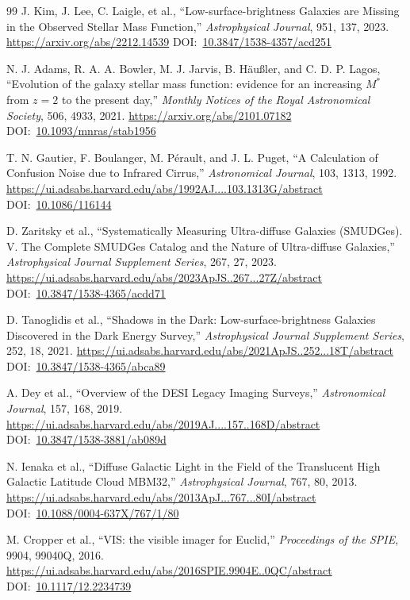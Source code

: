 \documentclass[10pt,onecolumn]{article}
\newcommand{\doi}[1]{DOI:~\href{https://doi.org/#1}{#1}}
\begin{document}
\begin{thebibliography}{99}
J. Kim, J. Lee, C. Laigle, et al.,
``Low-surface-brightness Galaxies are Missing in the Observed Stellar Mass Function,''
\emph{Astrophysical Journal}, 951, 137, 2023.
\url{https://arxiv.org/abs/2212.14539}
\doi{10.3847/1538-4357/acd251}

N. J. Adams, R. A. A. Bowler, M. J. Jarvis, B. H\"au{\ss}ler, and C. D. P. Lagos,
``Evolution of the galaxy stellar mass function: evidence for an increasing $M^{*}$ from $z=2$ to the present day,''
\emph{Monthly Notices of the Royal Astronomical Society}, 506, 4933, 2021.
\url{https://arxiv.org/abs/2101.07182}
\doi{10.1093/mnras/stab1956}

T. N. Gautier, F. Boulanger, M. P\'erault, and J. L. Puget,
``A Calculation of Confusion Noise due to Infrared Cirrus,''
\emph{Astronomical Journal}, 103, 1313, 1992.
\url{https://ui.adsabs.harvard.edu/abs/1992AJ....103.1313G/abstract}
\doi{10.1086/116144}

D. Zaritsky et al.,
``Systematically Measuring Ultra-diffuse Galaxies (SMUDGes). V. The Complete SMUDGes Catalog and the Nature of Ultra-diffuse Galaxies,''
\emph{Astrophysical Journal Supplement Series}, 267, 27, 2023.
\url{https://ui.adsabs.harvard.edu/abs/2023ApJS..267...27Z/abstract}
\doi{10.3847/1538-4365/acdd71}

D. Tanoglidis et al.,
``Shadows in the Dark: Low-surface-brightness Galaxies Discovered in the Dark Energy Survey,''
\emph{Astrophysical Journal Supplement Series}, 252, 18, 2021.
\url{https://ui.adsabs.harvard.edu/abs/2021ApJS..252...18T/abstract}
\doi{10.3847/1538-4365/abca89}

A. Dey et al.,
``Overview of the DESI Legacy Imaging Surveys,''
\emph{Astronomical Journal}, 157, 168, 2019.
\url{https://ui.adsabs.harvard.edu/abs/2019AJ....157..168D/abstract}
\doi{10.3847/1538-3881/ab089d}

N. Ienaka et al.,
``Diffuse Galactic Light in the Field of the Translucent High Galactic Latitude Cloud MBM32,''
\emph{Astrophysical Journal}, 767, 80, 2013.
\url{https://ui.adsabs.harvard.edu/abs/2013ApJ...767...80I/abstract}
\doi{10.1088/0004-637X/767/1/80}

M. Cropper et al.,
``VIS: the visible imager for Euclid,''
\emph{Proceedings of the SPIE}, 9904, 99040Q, 2016.
\url{https://ui.adsabs.harvard.edu/abs/2016SPIE.9904E..0QC/abstract}
\doi{10.1117/12.2234739}


\end{thebibliography}
\end{document}
